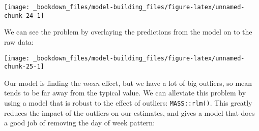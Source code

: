 \documentclass[]{book}
\newenvironment{Shaded}{\begin{snugshade}}{\end{snugshade}}
\newcommand{\KeywordTok}[1]{\textcolor[rgb]{0.13,0.29,0.53}{\textbf{{#1}}}}
\newcommand{\DataTypeTok}[1]{\textcolor[rgb]{0.13,0.29,0.53}{{#1}}}
\newcommand{\DecValTok}[1]{\textcolor[rgb]{0.00,0.00,0.81}{{#1}}}
\newcommand{\StringTok}[1]{\textcolor[rgb]{0.31,0.60,0.02}{{#1}}}
\newcommand{\NormalTok}[1]{{#1}}
\begin{document}
\begin{center}\texttt{[image: \_bookdown\_files/model-building\_files/figure-latex/unnamed-chunk-24-1]} \end{center}

We can see the problem by overlaying the predictions from the model on
to the raw data:

\begin{Shaded}
\end{Shaded}

\begin{center}\texttt{[image: \_bookdown\_files/model-building\_files/figure-latex/unnamed-chunk-25-1]} \end{center}

Our model is finding the \emph{mean} effect, but we have a lot of big
outliers, so mean tends to be far away from the typical value. We can
alleviate this problem by using a model that is robust to the effect of
outliers: \texttt{MASS::rlm()}. This greatly reduces the impact of the
outliers on our estimates, and gives a model that does a good job of
removing the day of week pattern:

\begin{Shaded}
\end{Shaded}
\end{document}

